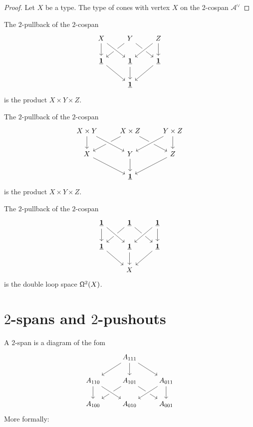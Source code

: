 \begin{proof}
Let $X$ be a type. The type of cones with vertex $X$ on the 2-cospan $\mathcal{A}^{\vee}$
\end{proof}

\begin{cor}
The $2$-pullback of the $2$-cospan
\begin{equation*}
\begin{tikzcd}
X \arrow[d] & Y \arrow[dl] \arrow[dr] & Z \arrow[d] \\
\unit \arrow[dr] & \unit \arrow[d] \arrow[from=ul,crossing over] \arrow[from=ur,crossing over] & \unit \arrow[dl] \\
& \unit
\end{tikzcd}
\end{equation*}
is the product $X\times Y\times Z$. 
\end{cor}

\begin{cor}
The $2$-pullback of the $2$-cospan
\begin{equation*}
\begin{tikzcd}
X\times Y \arrow[d] & X\times Z \arrow[dl] \arrow[dr] & Y\times Z \arrow[d] \\
X \arrow[dr] & Y \arrow[d] \arrow[from=ul,crossing over] \arrow[from=ur,crossing over] & Z \arrow[dl] \\
& \unit
\end{tikzcd}
\end{equation*}
is the product $X\times Y\times Z$. 
\end{cor}

\begin{cor}
The $2$-pullback of the $2$-cospan
\begin{equation*}
\begin{tikzcd}
\unit \arrow[d] & \unit \arrow[dl] \arrow[dr] & \unit \arrow[d] \\
\unit \arrow[dr] & \unit \arrow[d] \arrow[from=ul,crossing over] \arrow[from=ur,crossing over] & \unit \arrow[dl] \\
& X
\end{tikzcd}
\end{equation*}
is the double loop space $\loopspace[2]{X}$. 
\end{cor}

\section{$2$-spans and $2$-pushouts}

A $2$-span is a diagram of the fom
\begin{equation*}
\begin{tikzcd}
& A_{111} \arrow[dl] \arrow[d] \arrow[dr] \\
A_{110} \arrow[d] & A_{101} \arrow[dl] \arrow[dr] & A_{011} \arrow[d] \\
A_{100} & A_{010} \arrow[from=ul,crossing over] \arrow[from=ur,crossing over] & A_{001}
\end{tikzcd}
\end{equation*}
More formally:

